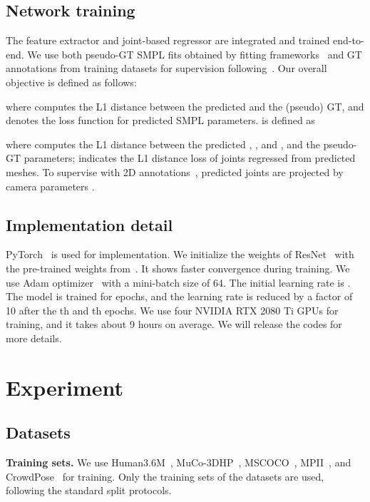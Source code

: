 \documentclass[10pt,twocolumn,letterpaper]{article}
\begin{document}
 

\subsection{Network training}
The feature extractor and joint-based regressor are integrated and trained end-to-end.
We use both pseudo-GT SMPL fits obtained by fitting frameworks~\cite{pavlakos2019expressive,moon2020neuralannot} and GT annotations from training datasets for supervision following~\cite{kolotouros2019learning}.
Our overall objective is defined as follows:


where  computes the L1 distance between the predicted  and the (pseudo) GT, and  denotes the loss function for predicted SMPL parameters.
 is defined as



where  computes the L1 distance between the predicted , , and , and the pseudo-GT parameters; 
 indicates the L1 distance loss of joints regressed from predicted meshes.
To supervise with 2D annotations~\cite{lin2014mscoco,andriluka2014mpii}, predicted joints are projected by camera parameters . 



\subsection{Implementation detail}
PyTorch~\cite{paszke2017automatic} is used for implementation. 
We initialize the weights of ResNet~\cite{he2016deep} with the pre-trained weights from~\cite{xiao2018simple}.
It shows faster convergence during training.
We use Adam optimizer~\cite{kingma2014adam} with a mini-batch size of 64.
The initial learning rate is .
The model is trained for  epochs, and the learning rate is reduced by a factor of 10 after the th and th epochs.
We use four NVIDIA RTX 2080 Ti GPUs for training, and it takes about 9 hours on average.
We will release the codes for more details. \section{Experiment}
\label{section:experiment}
\subsection{Datasets}

\noindent\textbf{Training sets.}
We use Human3.6M~\cite{ionescu2014human3}, MuCo-3DHP~\cite{mehta2018single}, MSCOCO~\cite{lin2014mscoco}, MPII~\cite{andriluka2014mpii}, and CrowdPose~\cite{li2019crowdpose} for training.
Only the training sets of the datasets are used, following the standard split protocols.
\end{document}
